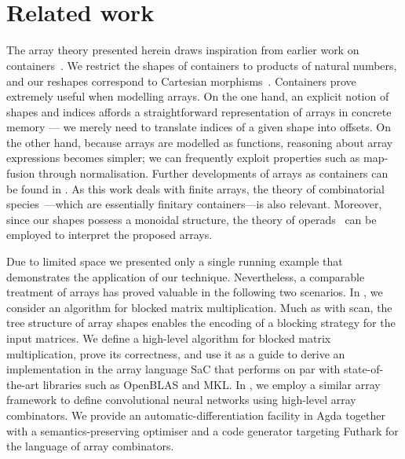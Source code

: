 \begin{code}[hide]%
\>[0]\AgdaSpace{}%
\AgdaSpace{}%
\<%
\\
\>[0]\AgdaSpace{}%
\AgdaSpace{}%
\<%
\\
\>[0]\AgdaSpace{}%
\AgdaSpace{}%
\<%
\end{code}

\section{\label{sec:related}Related work}

The array theory presented herein draws inspiration from earlier work on
containers~\citep{containers}.  We restrict the shapes of containers to
products of natural numbers, and our reshapes correspond to Cartesian
morphisms~\citep{10.1007/3-540-36576-1_2}.  Containers prove extremely useful
when modelling arrays.  On the one hand, an explicit notion of shapes and
indices affords a straightforward representation of arrays in concrete memory ---
we merely need to translate indices of a given shape into offsets.  On the
other hand, because arrays are modelled as functions, reasoning about array
expressions becomes simpler; we can frequently exploit properties such as
map-fusion through normalisation.  Further developments of arrays as containers
can be found in \citet{sinkarovs_2020}.  As this work deals with finite arrays,
the theory of combinatorial species~\citep{Yorgey2014}---which are essentially
finitary containers---is also relevant.  Moreover, since our shapes possess a
monoidal structure, the theory of operads~\citep{May1972} can be employed to
interpret the proposed arrays.

Due to limited space we presented only a single running example that
demonstrates the application of our technique.  Nevertheless, a comparable
treatment of arrays has proved valuable in the following two scenarios.
In \citet{10.1145/3609024.3609410}, we consider an algorithm for blocked matrix
multiplication.  Much as with scan, the tree structure of array shapes enables
the encoding of a blocking strategy for the input matrices.  We define a
high-level algorithm for blocked matrix multiplication, prove its correctness,
and use it as a guide to derive an implementation in the array language SaC
that performs on par with state-of-the-art libraries such as OpenBLAS and MKL.
In \citet{10.1145/3747524}, we employ a similar array framework to define
convolutional neural networks using high-level array combinators.  We provide
an automatic-differentiation facility in Agda together with a
semantics-preserving optimiser and a code generator targeting Futhark for the
language of array combinators.

